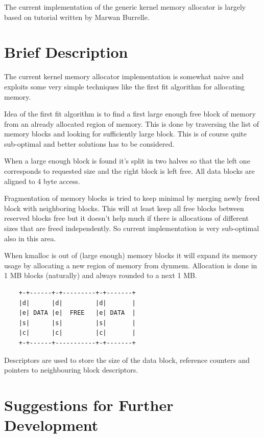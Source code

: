 The current implementation of the generic kernel memory allocator is largely
based on tutorial written by Marwan Burrelle\cite{Burelle:malloc}.

\section{Brief Description}

The current kernel memory allocator implementation is somewhat naive and
exploits some very simple techniques like the first fit algorithm for allocating
memory.

Idea of the first fit algorithm is to find a first large enough free block of
memory from an already allocated region of memory. This is done by traversing
the list of memory blocks and looking for sufficiently large block. This is
of course quite sub-optimal and better solutions has to be considered.

When a large enough block is found it's split in two halves so that the left
one corresponds to requested size and the right block is left free. All data
blocks are aligned to 4 byte access.

Fragmentation of memory blocks is tried to keep minimal by merging newly freed
block with neighboring blocks. This will at least keep all free blocks between
reserved blocks free but it doesn't help much if there is allocations of
different sizes that are freed independently. So current implementation is very
sub-optimal also in this area.

When kmalloc is out of (large enough) memory blocks it will expand its memory
usage by allocating a new region of memory from dynmem. Allocation is done in
1 MB blocks (naturally) and always rounded  to a next 1 MB.

\begin{verbatim}
    +-+------+-+---------+-+-------+
    |d|      |d|         |d|       |
    |e| DATA |e|  FREE   |e| DATA  |
    |s|      |s|         |s|       |
    |c|      |c|         |c|       |
    +-+------+-----------+-+-------+
\end{verbatim}

Descriptors are used to store the size of the data block, reference counters and
pointers to neighbouring block descriptors.


\section{Suggestions for Further Development}

